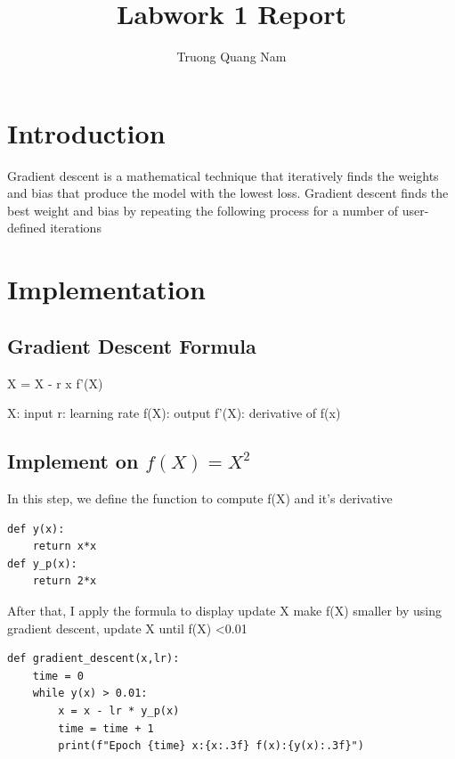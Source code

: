 \documentclass{article}
\title{Labwork 1 Report}
\author{Truong Quang Nam}
\begin{document}
\maketitle



\section{Introduction}



Gradient descent is a mathematical technique that iteratively finds the weights and bias that produce the model with the lowest loss. Gradient descent finds the best weight and bias by repeating the following process for a number of user-defined iterations

\section{Implementation}

\subsection{Gradient Descent Formula}

X = X - r x f'(X)

X: input
r: learning rate
f(X): output 
f'(X): derivative of f(x)

\subsection{Implement on $f(X) = X^2$}
In this step, we define the function to compute f(X) and it's derivative
\begin{lstlisting}
def y(x):
    return x*x
def y_p(x):
    return 2*x  

\end{lstlisting}


After that, I apply the formula to display update X make f(X) smaller by using gradient descent, update X until f(X) \textless  0.01

\begin{lstlisting}
def gradient_descent(x,lr):
    time = 0
    while y(x) > 0.01:
        x = x - lr * y_p(x)
        time = time + 1
        print(f"Epoch {time} x:{x:.3f} f(x):{y(x):.3f}")

\end{lstlisting}
\end{document}

